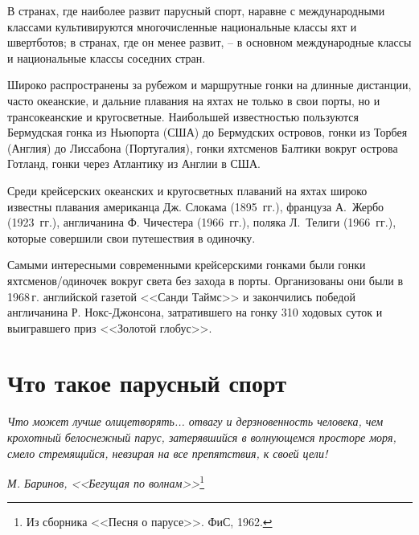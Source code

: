\documentclass[a4paper, 12pt, twoside, final]{scrbook}
\begin{document}
В странах, где наиболее развит парусный спорт, наравне с международными
классами культивируются многочисленные национальные классы яхт и швертботов;
в странах, где он менее развит, \--- в основном международные классы
и национальные классы соседних стран.

Широко распространены за рубежом и маршрутные гонки на длинные дистанции,
часто океанские, и дальние плавания на яхтах не только в свои порты,
но и трансокеанские и кругосветные. Наибольшей известностью пользуются
Бермудская гонка из Ньюпорта (США) до Бермудских островов, гонки из
Торбея (Англия) до Лиссабона (Португалия), гонки яхтсменов Балтики
вокруг острова Готланд, гонки через Атлантику из Англии в США.

Среди крейсерских океанских и кругосветных плаваний на яхтах широко
известны плавания американца Дж. Слокама (1895~гг.), француза
А.~Жербо (1923~гг.), англичанина Ф. Чичестера (1966~гг.),
поляка Л.~Телиги (1966~гг.), которые совершили свои путешествия
в одиночку.

Самыми интересными современными крейсерскими гонками были гонки яхтсменов\-/одиночек вокруг света без захода в порты. Организованы они были в
1968\,г. английской газетой <<Санди Таймс>> и закончились победой англичанина
Р. Нокс-Джонсона, затратившего на гонку 310 ходовых суток и выигравшего
приз <<Золотой глобус>>.


\section{Что такое парусный спорт}

\epigraph{\emph{Что может лучше олицетворять... отвагу и дерзновенность человека, чем крохотный белоснежный парус, затерявшийся в волнующемся просторе моря, смело стремящийся, невзирая на все препятствия, к своей цели!}}{\emph{М. Баринов, <<Бегущая по волнам>>}\footnote{Из сборника <<Песня о парусе>>. ФиС, 1962.}}
\end{document}
